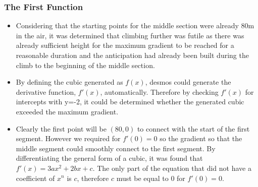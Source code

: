 \documentclass[11pt, letterpaper]{article}
\begin{document}
\subsubsection{The First Function}
\begin{itemize}
	\item Considering that the starting points for the middle section were already 80m in the air, it was determined that climbing further was futile as there was already sufficient height for the maximum gradient to be reached for a reasonable duration and the anticipation had already been built during the climb to the beginning of the middle section. 
	
	

	
	\item By defining the cubic generated as $f(x)$, desmos could generate the derivative function, $f'(x)$, automatically. Therefore by checking $f'(x)$ for intercepts with y=-2, it could be determined whether the generated cubic exceeded the maximum gradient.
	\item Clearly the first point will be $(80, 0)$ to connect with the start of the first segment. However we required for $f'(0)=0$ so the gradient so that the middle segment could smoothly connect to the first segment. By differentiating the general form of a cubic, it was found that $f'(x)=3ax^2+2bx+c$. The only part of the equation that did not have a coefficient of $x^n$ is $c$, therefore $c$ must be equal to $0$ for $f'(0)=0$.
	

\end{itemize}
\end{document}
